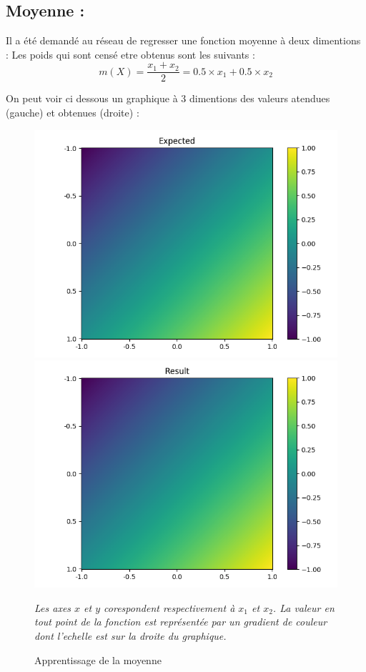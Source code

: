 
\subsection{Moyenne :}\label{subsec:moy}
Il a été demandé au réseau de regresser une fonction moyenne à deux dimentions :
Les poids qui sont censé etre obtenus sont les suivants :
\begin{equation}
    \label{eq:moy}
    m(X) =\frac{x_1 + x_2}{2} = 0.5 \times x_1 + 0.5 \times x_2
\end{equation}

On peut voir ci dessous un graphique à 3 dimentions des valeurs atendues (gauche) et obtenues (droite) :
\begin{figure}[H]
    \center
    \includegraphics[height=\petit]{pict/moy/expected}
    \includegraphics[height=\petit]{pict/moy/result}
	\caption{Apprentissage de la moyenne}
    \vspace{-10pt}
    \begin{center}
        \tiny
        \textit{
        Les axes $x$ et $y$ corespondent respectivement à $x_1$ et $x_2$.
        La valeur en tout point de la fonction est représentée par un gradient de couleur
        dont l'echelle est sur la droite du graphique.
        }
    \end{center}
	\label{fig:moy}
\end{figure}
\vspace{-12pt}

